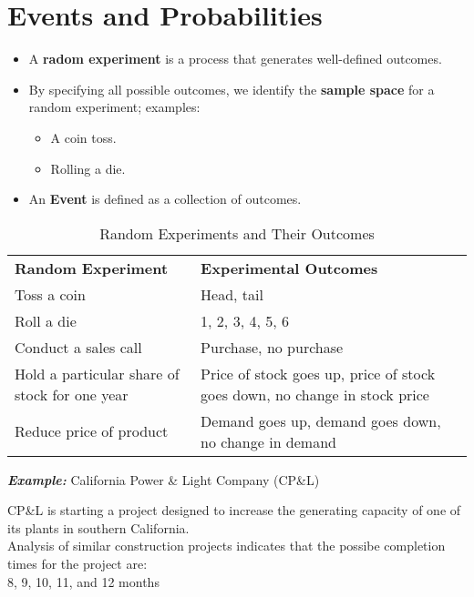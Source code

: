 \documentclass{report}
\begin{document}
  \section{Events and Probabilities}
  \begin{itemize}
    \item A \textbf{radom experiment}  is a process that generates well-defined outcomes.
    \item By specifying all possible outcomes, we identify the \textbf{sample space} for a random experiment; examples:
      \begin{itemize}[label=$\circ$]
      \item A coin toss.
      \item Rolling a die.
      \end{itemize}
    \item An \textbf{Event} is defined as a collection of outcomes.
  \end{itemize}
\begin{table}[h!]
\centering
\begin{tabular}{ll}
\textbf{Random Experiment} & \textbf{Experimental Outcomes} \\[0.5em]
Toss a coin & Head, tail \\[0.5em]
Roll a die & 1, 2, 3, 4, 5, 6 \\[0.5em]
Conduct a sales call & Purchase, no purchase \\[0.5em]
Hold a particular share of stock for one year & Price of stock goes up, price of stock goes down, no change in stock price \\[0.5em]
Reduce price of product & Demand goes up, demand goes down, no change in demand \\[0.5em]
\end{tabular}
\caption{Random Experiments and Their Outcomes}
\label{table:experiments_outcomes}
\end{table}
\bigbreak \noindent
\begin{large}{ \textit{\textbf{Example:}} California Power \& Light Company (CP\&L)}\end{large}
\bigbreak \noindent
CP\&L is starting a project designed to increase the generating capacity of one of its plants in southern California. \\ Analysis of similar construction projects indicates that the possibe completion times for the project are: \\
8, 9, 10, 11, and 12 months
\newpage
\end{document}
